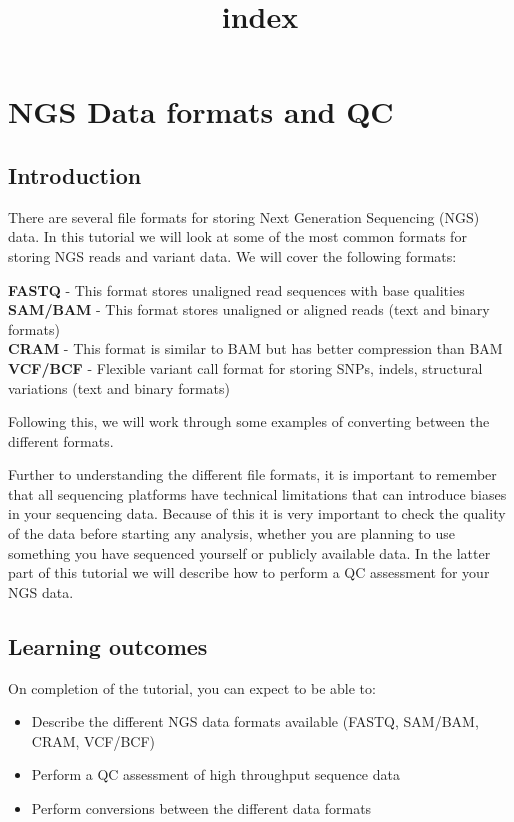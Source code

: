 \documentclass[11pt]{article}
\title{index}
\providecommand{\tightlist}{%
      \setlength{\itemsep}{0pt}\setlength{\parskip}{0pt}}
\begin{document}
    \hypertarget{ngs-data-formats-and-qc}{%
\section{NGS Data formats and QC}\label{ngs-data-formats-and-qc}}

\hypertarget{introduction}{%
\subsection{Introduction}\label{introduction}}

There are several file formats for storing Next Generation Sequencing
(NGS) data. In this tutorial we will look at some of the most common
formats for storing NGS reads and variant data. We will cover the
following formats:

\textbf{FASTQ} - This format stores unaligned read sequences with base
qualities\\
\textbf{SAM/BAM} - This format stores unaligned or aligned reads (text
and binary formats)\\
\textbf{CRAM} - This format is similar to BAM but has better compression
than BAM\\
\textbf{VCF/BCF} - Flexible variant call format for storing SNPs,
indels, structural variations (text and binary formats)

Following this, we will work through some examples of converting between
the different formats.

Further to understanding the different file formats, it is important to
remember that all sequencing platforms have technical limitations that
can introduce biases in your sequencing data. Because of this it is very
important to check the quality of the data before starting any analysis,
whether you are planning to use something you have sequenced yourself or
publicly available data. In the latter part of this tutorial we will
describe how to perform a QC assessment for your NGS data.

\hypertarget{learning-outcomes}{%
\subsection{Learning outcomes}\label{learning-outcomes}}

On completion of the tutorial, you can expect to be able to:

\begin{itemize}
\tightlist
\item
  Describe the different NGS data formats available (FASTQ, SAM/BAM,
  CRAM, VCF/BCF)
\item
  Perform a QC assessment of high throughput sequence data
\item
  Perform conversions between the different data formats
\end{itemize}
\end{document}
